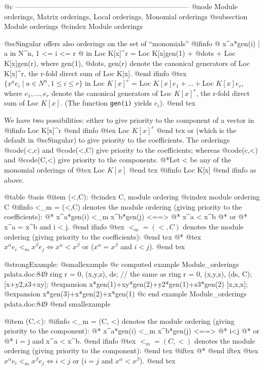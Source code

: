 @c --------------------------------------------------------------------------
@node Module orderings, Matrix orderings, Local orderings, Monomial orderings
@subsection Module orderings
@cindex Module orderings

@sc{Singular} offers also orderings on the set of ``monomials''
@ifinfo
@{ x^a*gen(i) | a in N^n, 1 <= i <= r @} in Loc K[x]^r = Loc K[x]gen(1)
+ @dots{} + Loc K[x]gen(r), where gen(1), @dots{}, gen(r) denote the canonical
generators of Loc K[x]^r, the r-fold direct sum of Loc K[x].
@end ifinfo
@tex
$\{ x^a e_i  \mid  a \in N^n, 1 \leq i \leq r \}$ in Loc $K[x]^r$ = Loc
$K[x]e_1 
+ \ldots +$Loc $K[x]e_r$, where $e_1, \ldots, e_r$ denote the canonical
generators of Loc $K[x]^r$, the r-fold direct sum of Loc $K[x]$.
(The function {\tt gen(i)} yields $e_i$).
@end tex

We have two possibilities: either to give priority to the component of a
vector in 
@ifinfo
Loc K[x]^r
@end ifinfo
@tex
 Loc $K[x]^r$
@end tex
or (which is the default in @sc{Singular}) to give priority
to the coefficients.
The orderings @code{(<,c)} and @code{(<,C)} give priority to the
coefficients; whereas
@code{(c,<)} and @code{(C,<)} give priority to the components.
@*Let < be any of the monomial orderings of 
@tex
Loc $K[x]$
@end tex
@ifinfo
Loc K[x]
@end ifinfo
as above.

@table @asis
@item (<,C):
@cindex C, module ordering
@cindex module ordering C
@ifinfo
<_m = (<,C) denotes the module ordering (giving priority to the coefficients):
@* x^a*gen(i) <_m x^b*gen(j) <==>
@* x^a < x^b
@* or
@* x^a = x^b  and  i < j.
@end ifinfo
@tex
$<_m = (<,C)$ denotes the module ordering (giving priority to the coefficients):
@end tex
@*
@tex
\quad  \quad  $x^\alpha e_i <_m x^\beta e_j \Leftrightarrow x^\alpha <
x^\beta$ or ($x^\alpha = x^\beta $ and $ i < j$).
@end tex

@strong{Example:}
@smallexample
@c computed example Module_orderings pdata.doc:849 
  ring r = 0, (x,y,z), ds;
  // the same as ring r = 0, (x,y,z), (ds, C);
  [x+y2,z3+xy];
@expansion{} x*gen(1)+xy*gen(2)+y2*gen(1)+z3*gen(2)
  [x,x,x];
@expansion{} x*gen(3)+x*gen(2)+x*gen(1)
@c end example Module_orderings pdata.doc:849
@end smallexample

@item (C,<):
@ifinfo
<_m = (C, <) denotes the module ordering (giving priority to the
component):
@* x^a*gen(i) <_m x^b*gen(j) <==>
@* i<j
@* or
@* i = j and x^a < x^b.
@end ifinfo
@tex
$<_m = (C, <)$ denotes the module ordering (giving priority to the component):
@end tex
@iftex
@*
@end iftex
@tex
\quad \quad   $x^\alpha e_i <_m x^\beta e_j \Leftrightarrow i < j$ or ($
i = j $ and $ x^\alpha < x^\beta $). 
@end tex

